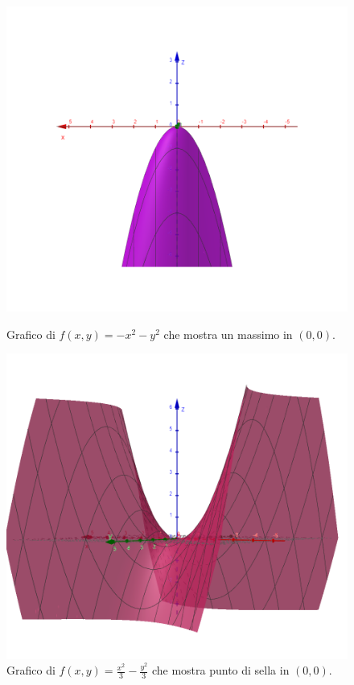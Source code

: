 \begin{example}
\begin{figure}[H]
\begin{minipage}{0.26\textwidth}
            \includegraphics[width=\textwidth]{Capitoli/Capitolo2/Massimo.png}
            \caption{Grafico di $f(x,y)=-x^2-y^2$ che mostra un massimo in $(0,0)$.}
        \end{minipage}
        \hspace{1cm}
        \begin{minipage}{0.26\textwidth}
            \centering
            \includegraphics[width=\textwidth]{Capitoli/Capitolo2/Sella 3.png}
            \caption{Grafico di $f(x,y)=\frac{x^2}{3}-\frac{y^2}{3}$ che mostra punto di sella in $(0,0)$.}
        \end{minipage}
    \end{figure}
\end{example}

